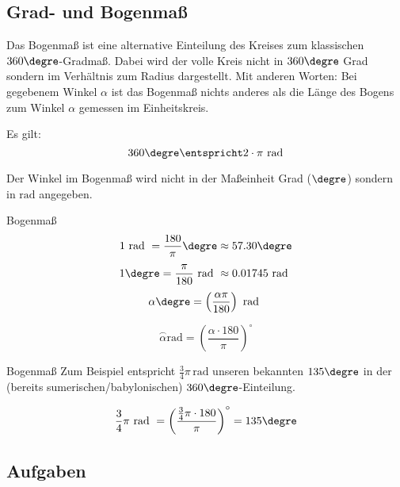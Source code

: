 
\subsection{Grad- und Bogenmaß}

Das Bogenmaß ist eine alternative Einteilung des Kreises zum
klassischen $360\degre$-Gradmaß. Dabei wird der volle Kreis nicht in
$360\degre$ Grad sondern im Verhältnis zum Radius dargestellt. Mit
anderen Worten: Bei gegebenem Winkel $\alpha$ ist das Bogenmaß nichts
anderes als die Länge des Bogens zum Winkel $\alpha$ gemessen im Einheitskreis.


Es gilt:
$$360\degre \entspricht 2\cdot\pi \textrm{\,\,rad}$$

Der Winkel im Bogenmaß wird nicht in der Maßeinheit Grad (${}\degre$)
sondern in $\textrm{rad}$ angegeben.

\begin{gesetz}{Bogenmaß}{}
$$1 \textrm{ rad } = \frac{180}{\pi}\degre \approx 57.30\degre$$
$$1\degre = \frac{\pi}{180} \textrm{ rad } \approx 0.01745 \textrm{ rad }$$
$$\alpha\degre = \left(\frac{\alpha\pi}{180}\right) \textrm{ rad }$$
  
$$\stackrel{\frown}{\alpha} \textrm{rad} = \left(\frac{\alpha\cdot{}180}{\pi}\right)^\circ$$
\end{gesetz}

\begin{beispiel}{Bogenmaß}{}
 Zum Beispiel entspricht
$\frac{3}{4}\pi\,\textrm{rad}$ unseren bekannten $135\degre$ in der
(bereits sumerischen/babylonischen) $360\degre$-Einteilung.

 $$\frac34\pi \textrm{ rad } = \left(\frac{\frac34\pi\cdot{}180}{\pi}\right)^\circ = 135\degre$$
\end{beispiel}
\newpage

\subsection*{Aufgaben}
\newpage
